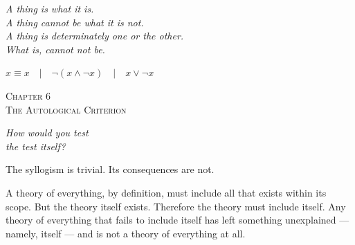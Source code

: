 \documentclass[10pt, openany, oneside]{book}
\renewcommand{\large}{\fontsize{11.5}{14}\selectfont}
\renewcommand{\huge}{\fontsize{17}{21}\selectfont}
\begin{document}
\vspace{0.5em}

\begin{center}
    \itshape
    A thing is what it is.\\
    A thing cannot be what it is not.\\
    A thing is determinately one or the other.\\[0.8em]
    What is, cannot not be.
\end{center}

\vspace{0.5em}

\begin{center}
    $x \equiv x \quad | \quad \neg(x \wedge \neg x) \quad | \quad x \vee \neg x$
\end{center}


%
%
%

\newpage

\begin{center}
    {\huge\scshape Chapter 6}\\[0.3em]
    {\large\scshape The Autological Criterion}
\end{center}

\vspace{1.5em}

\begin{center}
    \itshape
    How would you test\\
    the test itself?
\end{center}

\vspace{2em}


\noindent The syllogism is trivial. Its consequences are not.

A theory of everything, by definition, must include all that exists within its scope. But the theory itself exists. Therefore the theory must include itself. Any theory of everything that fails to include itself has left something unexplained --- namely, itself --- and is not a theory of everything at all.
\end{document}
